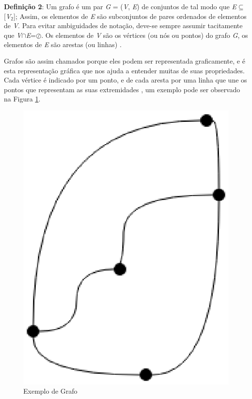 \textbf{Definição 2}: Um grafo é um par \textit{G} = (\textit{V}, \textit{E}) de conjuntos de tal modo que \textit{E}$\subseteq$[\textit{V}$_2$]; Assim, os elementos de \textit{E} são subconjuntos de pares ordenados de elementos de \textit{V}. Para evitar ambiguidades de notação, deve-se sempre assumir tacitamente que \textit{V}$\cap$\textit{E}=$\oslash$. Os elementos de \textit{V} são os vértices (ou nós ou pontos) do grafo \textit{G}, os elementos de \textit{E} são arestas (ou linhas) \cite{Diestel:1997}.

Grafos são assim chamados porque eles podem ser representada graficamente, e é esta representação gráfica que nos ajuda a entender muitas de suas propriedades. Cada vértice é indicado por um ponto, e de cada aresta por uma linha que une os pontos que representam as suas extremidades \cite{Bondy:2007}, um exemplo pode ser observado na Figura \ref{exemplo_grafo}.

\begin{figure}[!h]
	\centering
	\includegraphics[scale=0.3]{figuras/capitulo2/exemplo_grafo.eps}
	\caption{Exemplo de Grafo}
	\label{exemplo_grafo}
\end{figure}

